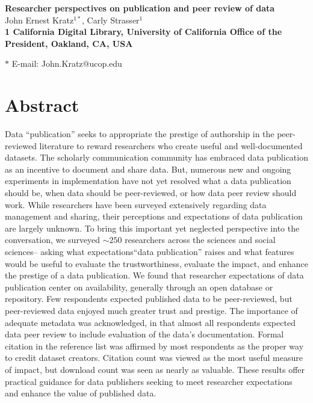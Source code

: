 \documentclass[10pt]{article}
\date{}
\begin{document}
\begin{flushleft}
{\Large
\textbf{Researcher perspectives on publication and peer review of data}
}
\\
John Ernest Kratz$^{1\ast}$, 
Carly Strasser$^{1}$ 
\\
\bf{1} California Digital Library, University of California Office of the President, Oakland, CA, USA

$\ast$ E-mail: John.Kratz@ucop.edu
\end{flushleft}


\section*{Abstract}

Data ``publication'' seeks to appropriate the prestige of authorship in the peer-reviewed literature to reward researchers who create useful and well-documented datasets. 
The scholarly communication community has embraced data publication as an incentive to document and share data.
But, numerous new and ongoing experiments in implementation have not yet resolved what a data publication should be, when data should be peer-reviewed, or how data peer review should work. 
While researchers have been surveyed extensively regarding data management and sharing, their perceptions and expectations of data publication are largely unknown.
To bring this important yet neglected perspective into the conversation, we surveyed $\sim250$ researchers across the sciences and social sciences-- asking what expectations``data publication'' raises and what features would be useful to evaluate the trustworthiness, evaluate the impact, and enhance the prestige of a data publication.
We found that researcher expectations of data publication center on availability, generally through an open database or repository.
Few respondents expected published data to be peer-reviewed, but peer-reviewed data enjoyed much greater trust and prestige.
The importance of adequate metadata was acknowledged, in that almost all respondents expected data peer review to include evaluation of the data's documentation.
Formal citation in the reference list was affirmed by most respondents as the proper way to credit dataset creators.
Citation count was viewed as the most useful measure of impact, but download count was seen as nearly as valuable.
These results offer practical guidance for data publishers seeking to meet researcher expectations and enhance the value of published data.
\end{document}
